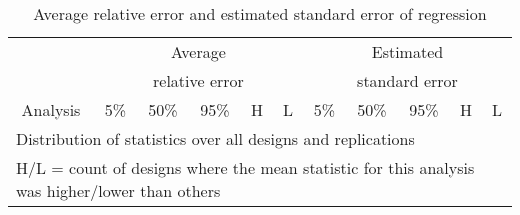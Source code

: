 \documentclass[a4paper,10pt]{article}
\begin{document}
\begin{table}[ht]
\begin{center}
\caption{Average relative error and estimated standard error of regression}
\begin{tabular}{lrrrrrrrrrr}
\toprule
&\multicolumn{5}{c}{Average}&\multicolumn{5}{c}{Estimated} \\
&\multicolumn{5}{c}{relative error}&\multicolumn{5}{c}{standard error} \\
\cmidrule(l{.75em}){2-6}\cmidrule(l{.75em}){7-11}
\multicolumn{1}{c}{Analysis}&\multicolumn{1}{c}{5\%}&\multicolumn{1}{c}{50\%}&\multicolumn{1}{c}{95\%}&\multicolumn{1}{c}{H}&\multicolumn{1}{c}{L}&\multicolumn{1}{c}{5\%}&\multicolumn{1}{c}{50\%}&\multicolumn{1}{c}{95\%}&\multicolumn{1}{c}{H}&\multicolumn{1}{c}{L} \\
\midrule

\bottomrule
\multicolumn{11}{l}{\footnotesize{Distribution of statistics over all designs and replications}} \\
\multicolumn{11}{l}{\footnotesize{H/L = count of designs where the mean statistic for this analysis was higher/lower than others}} \\
\end{tabular}
\end{center}
\end{table}
\end{document}
